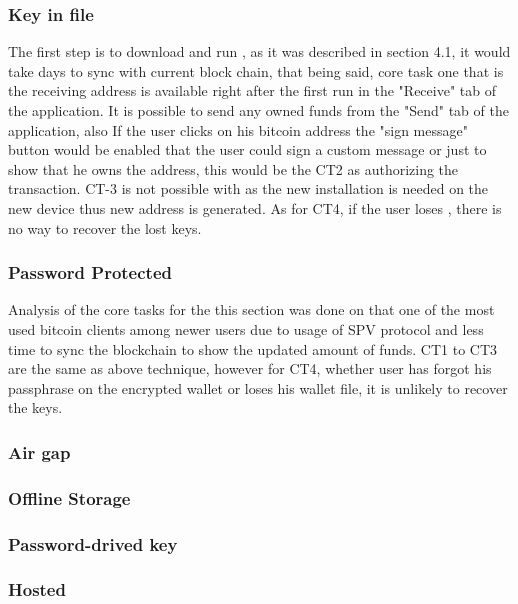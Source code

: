 
\subsubsection{Key in file}
The first step is to download and run \bitcoinclient, as it was described in section 4.1, it would take days to sync with current block chain, that being said, core task one that is the receiving address is available right after the first run in the "Receive" tab of the application. It is possible to send any owned funds from the "Send" tab of the application, also If the user clicks on his bitcoin address the "sign message" button would be enabled that the user could sign a custom message or just to show that he owns the address, this would be the CT2 as authorizing the transaction. CT-3 is not possible with \bitcoinclient as the new installation is needed on the new device thus new address is generated. As for CT4, if the user loses \walletfile, there is no way to recover the lost keys.


\subsubsection{Password Protected}
Analysis of the core tasks for the this section was done on \multibit that one of the most used bitcoin clients among newer users due to usage of SPV protocol and less time to sync the blockchain to show the updated amount of funds. CT1 to CT3 are the same as above technique, however for CT4, whether user has forgot his passphrase on the encrypted wallet or loses his wallet file, it is unlikely to recover the keys.


\subsubsection{Air gap}


\subsubsection{Offline Storage}


\subsubsection{Password-drived key}


\subsubsection{Hosted}
